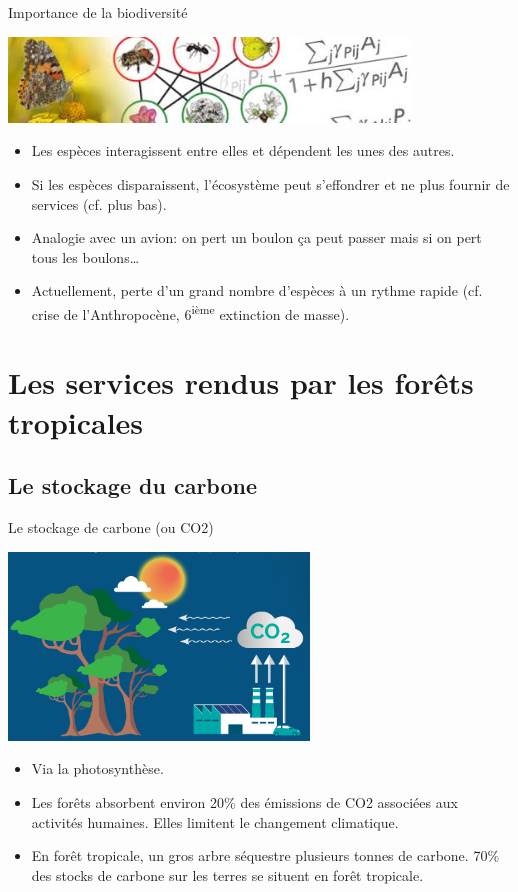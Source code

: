 \documentclass[10pt,table,dvipsnames,compress]{beamer}
\begin{document}
\begin{frame}[label={sec:orga92a8c0}]{Importance de la biodiversité}
\begin{center}
\includegraphics[width=0.8\textwidth]{figs/biodiversity-network.jpg}
\end{center}

\begin{itemize}
\item Les espèces interagissent entre elles et dépendent les unes des autres.
\item Si les espèces disparaissent, l'écosystème peut s'effondrer et ne plus fournir de services (cf. plus bas).
\item Analogie avec un avion: on pert un boulon ça peut passer mais si on pert tous les boulons\ldots{}
\item Actuellement, perte d'un grand nombre d'espèces à un rythme rapide (cf. crise de l'Anthropocène, 6\textsuperscript{ième} extinction de masse).
\end{itemize}
\end{frame}
\section{Les services rendus par les forêts tropicales}
\label{sec:org02191cf}

\subsection{Le stockage du carbone}
\label{sec:org846051b}

\begin{frame}[label={sec:org3a077c1}]{Le stockage de carbone (ou CO2)}
\begin{center}
\includegraphics[width=0.6\textwidth]{figs/carbon-sequestration-by-forests.png}
\end{center}

\begin{itemize}
\item Via la photosynthèse.
\item Les forêts absorbent environ 20\% des émissions de CO2 associées aux activités humaines. Elles limitent le changement climatique.
\item En forêt tropicale, un gros arbre séquestre plusieurs tonnes de carbone. 70\% des stocks de carbone sur les terres se situent en forêt tropicale.
\end{itemize}
\end{frame}
\end{document}
